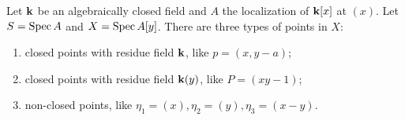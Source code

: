     \begin{example}
        Let ${\mathbf{k}}$ be an algebraically closed field and $A$ the localization of ${\mathbf{k}}[x]$ at $(x)$.
        Let $S = \operatorname{Spec} A$ and $X = \operatorname{Spec} A[y]$. 
        There are three types of points in $X$:
        \begin{enumerate}[label=(\roman*)]
            \item closed points with residue field ${\mathbf{k}}$, like $p = (x,y-a)$;
            \item closed points with residue field ${\mathbf{k}}(y)$, like $P = (xy-1)$;
            \item non-closed points, like $\eta_1 = (x),\eta_2 = (y),\eta_3 = (x-y)$.
        \end{enumerate}

    \end{example}





